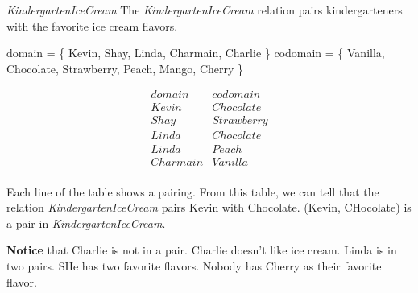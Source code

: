\documentclass{ximera}
\begin{document}
\begin{example} \textit{KindergartenIceCream}
The \textit{KindergartenIceCream} relation pairs kindergarteners with the favorite ice cream flavors.

domain = \{ Kevin, Shay, Linda, Charmain, Charlie \}  
codomain = \{ Vanilla, Chocolate, Strawberry, Peach, Mango, Cherry \} 

\[
\begin{array}{l|l}
    domain      & codomain      \\ \hline
    Kevin   &  Chocolate \\
    Shay   & Strawberry \\
    Linda  &  Chocolate \\
    Linda  &  Peach \\
    Charmain &  Vanilla \\ 
\end{array}
\]


Each line of the table shows a pairing. From this table, we can tell that the relation \textit{KindergartenIceCream} pairs Kevin with Chocolate.  (Kevin, CHocolate) is a pair in \textit{KindergartenIceCream}.

\textbf{Notice} that Charlie is not in a pair.  Charlie doesn't like ice cream. Linda is in two pairs.  SHe has two favorite flavors.  Nobody has Cherry as their favorite flavor.




\end{example} 
\end{document}
